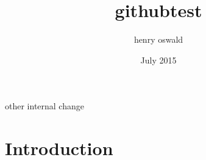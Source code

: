 \documentclass{article}
\title{githubtest}
\author{henry oswald}
\date{July 2015}
\begin{document}
\maketitle
other
internal change

\section{Introduction}
\end{document}
